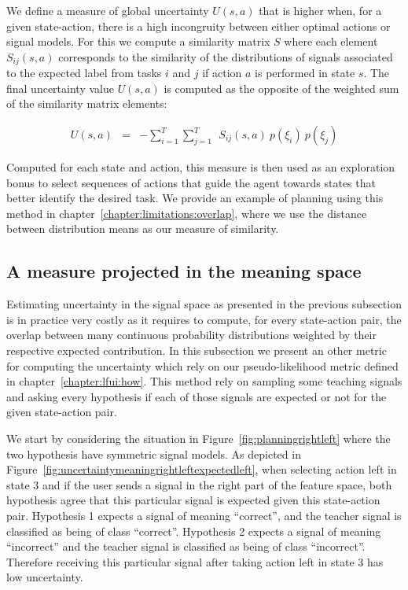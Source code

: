 We define a measure of global uncertainty $U(s,a)$ that is higher when, for a given state-action, there is a high incongruity between either optimal actions or signal models. For this we compute a similarity matrix $S$ where each element $S_{ij}(s,a)$ corresponds to the similarity of the distributions of signals associated to the expected label from tasks $i$ and $j$ if action $a$ is performed in state $s$. The final uncertainty value $U(s,a)$ is computed as the opposite of the weighted sum of the similarity matrix elements:

\begin{eqnarray}
U(s,a) &=& - \sum_{i = 1}^{T} \sum_{j = 1}^{T} ~~ S_{ij}(s,a) ~ p(\xi_i) ~ p(\xi_j)
\end{eqnarray}

Computed for each state and action, this measure is then used as an exploration bonus to select sequences of actions that guide the agent towards states that better identify the desired task. We provide an example of planning using this method in chapter~\ref{chapter:limitations:overlap}, where we use the distance between distribution means as our measure of similarity.

\subsection{A measure projected in the meaning space}

Estimating uncertainty in the signal space as presented in the previous subsection is in practice very costly as it requires to compute, for every state-action pair, the overlap between many continuous probability distributions weighted by their respective expected contribution. In this subsection we present an other metric for computing the uncertainty which rely on our pseudo-likelihood metric defined in chapter~\ref{chapter:lfui:how}. This method rely on sampling some teaching signals and asking every hypothesis if each of those signals are expected or not for the given state-action pair. 

We start by considering the situation in Figure~\ref{fig:planningrightleft} where the two hypothesis have symmetric signal models. As depicted in Figure~\ref{fig:uncertaintymeaningrightleftexpectedleft}, when selecting action left in state 3 and if the user sends a signal in the right part of the feature space, both hypothesis agree that this particular signal is expected given this state-action pair. Hypothesis 1 expects a signal of meaning ``correct'', and the teacher signal is classified as being of class ``correct''. Hypothesis 2 expects a signal of meaning ``incorrect'' and the teacher signal is classified as being of class ``incorrect''. Therefore receiving this particular signal after taking action left in state 3 has low uncertainty.

